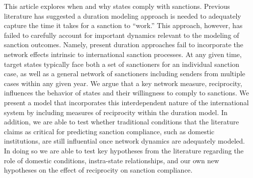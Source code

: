 This article explores when and why states comply with sanctions. Previous literature has suggested a duration modeling approach is needed to adequately capture the time it takes for a sanction to ``work.'' This approach, however, has failed to carefully account for important dynamics relevant to the modeling of sanction outcomes. Namely, present duration approaches fail to incorporate the network effects intrinsic to international sanction processes. At any given time, target states typically face both a set of sanctioners for an individual sanction case, as well as a general network of sanctioners including senders from multiple cases within any given year. We argue that a key network measure, reciprocity, influences the behavior of states and their willingness to comply to sanctions. We present a model that incorporates this interdependent nature of the international system by including measures of reciprocity within the duration model. In addition, we are able to test whether traditional conditions that the literature claims as critical for predicting sanction compliance, such as domestic institutions, are still influential once network dynamics are adequately modeled. In doing so we are able to test key hypotheses from the literature regarding the role of domestic conditions, instra-state relationships, and our own new hypotheses on the effect of reciprocity on sanction compliance. 